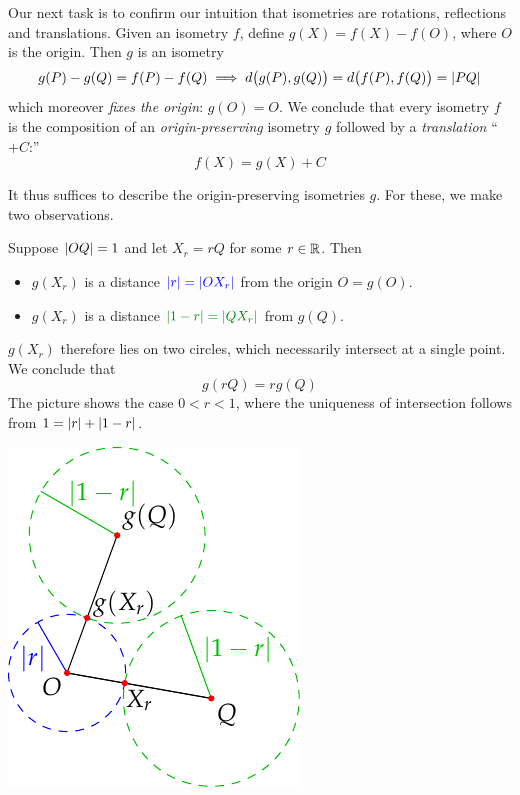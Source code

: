 Our next task is to confirm our intuition that isometries are rotations, reflections and translations. Given an isometry $f$, define $g(X)=f(X)-f(O)$, where $O$ is the origin. Then $g$ is an isometry
\[
	g(P)-g(Q)=f(P)-f(Q)\implies d\bigl(g(P),g(Q)\bigr)=d\bigl(f(P),f(Q)\bigr)=\left| PQ\right|
\]
which moreover \emph{fixes the origin}: $g(O)=O$. We conclude that every isometry $f$ is the composition of an \emph{origin-preserving} isometry $g$ followed by a \emph{translation} ``$+C$:''
\[
	f(X)=g(X)+C
\]

\goodbreak

It thus suffices to describe the origin-preserving isometries $g$. For these, we make two observations.
\begin{enumerate}
	\begin{minipage}[t]{0.68\linewidth}\vspace{0pt}
	  \item\label{affinity} Suppose $\left| OQ\right|=1$ and let $X_r=rQ$ for some $r\in\mathbb{R}$. Then
	  \begin{itemize}
	    \item $g(X_r)$ is a distance $\textcolor{blue}{\left| r\right|=\left| OX_r\right|}$ from the origin $O=g(O)$.
	    \item $g(X_r)$ is a distance $\textcolor{Green}{\nm{1-r}=\nm{QX_r}}$ from $g(Q)$.
	  \end{itemize}
	  $g(X_r)$ therefore lies on two circles, which necessarily intersect at a single point. We conclude that
	  \[
	  	g(rQ)=rg(Q)
	  \]
	  The picture shows the case $0<r<1$, where the uniqueness of intersection follows from
	  $1=\left| r\right|+\left| 1-r\right|$.
	\end{minipage}
	\hfill
	\begin{minipage}[t]{0.31\linewidth}\vspace{0pt}
		\flushright\includegraphics[scale=0.95]{isom-scale}

\end{minipage}
\end{enumerate}

